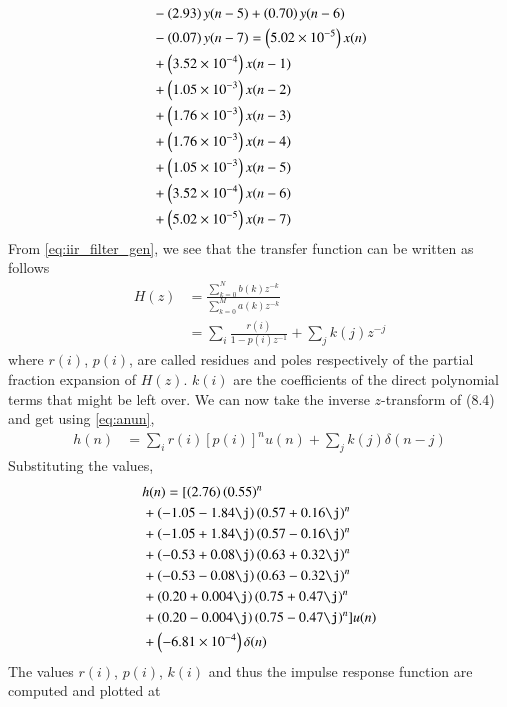 \documentclass[journal,12pt,twocolumn]{IEEEtran}
\renewcommand\thesection{\arabic{section}}
\begin{document}
\begin{enumerate}[label=\thesection.\arabic*
	,ref=\thesection.\theenumi]
\begin{enumerate}[label=\thesection.\arabic*]
\begin{align*}
&- \left(2.93\right)y(n - 5) \nonumber + \left(0.70\right)y(n - 6) \nonumber \\
&- \left(0.07\right)y(n - 7) = \left(5.02 \times 10^{-5}\right)x(n) \nonumber \\
&+ \left(3.52 \times 10^{-4}\right)x(n - 1)  \\
&+ \left(1.05 \times 10^{-3}\right)x(n - 2) \nonumber \\
&+ \left(1.76 \times 10^{-3}\right)x(n - 3) \\
&+ \left(1.76 \times 10^{-3}\right)x(n - 4) \nonumber \\
&+ \left(1.05 \times 10^{-3}\right)x(n - 5) \\
&+ \left(3.52 \times 10^{-4}\right)x(n - 6) \nonumber \\
&+ \left(5.02 \times 10^{-5}\right)x(n - 7)
\end{align*}
	From \eqref{eq:iir_filter_gen}, we see that the transfer function can be written as follows
	\begin{align}
		H(z) &= \frac{\sum_{k = 0}^{N}b(k)z^{-k}}{\sum_{k = 0}^{M}a(k)z^{-k}} \\
		&= \sum_{i}\frac{r(i)}{1 - p(i)z^{-1}} + \sum_{j}k(j)z^{-j}
		\label{eq:trans-func}
	\end{align}
	where $r(i)$, $p(i)$, are called residues and poles respectively of the partial 
	fraction expansion of $H(z)$. $k(i)$ are the coefficients of the direct polynomial 
	terms that might be left over. We can now take the inverse $z$-transform of (8.4) and get using \eqref{eq:anun},
	\begin{align}
		h(n) &= \sum_{i}r(i)[p(i)]^nu(n) + \sum_{j}k(j)\delta(n - j)
		\label{eq:h-n-expr}
	\end{align}
	Substituting the values,
	\begin{align}
		&h(n) = [\brak{2.76}\brak{0.55}^n \nonumber \\ 
		&+ \brak{-1.05-1.84\j}\brak{0.57+0.16\j}^n \nonumber \\
		&+ \brak{-1.05+1.84\j}\brak{0.57-0.16\j}^n \nonumber \\
		&+ \brak{-0.53+0.08\j}\brak{0.63+0.32\j}^n \nonumber \\
		&+ \brak{-0.53-0.08\j}\brak{0.63-0.32\j}^n \nonumber \\
		&+ \brak{0.20+0.004\j}\brak{0.75+0.47\j}^n \nonumber \\
		&+ \brak{0.20-0.004\j}\brak{0.75-0.47\j}^n]u(n) \nonumber \\
		&+ \brak{-6.81 \times 10^{-4}}\delta(n)
	\end{align}
	The values $r(i)$, $p(i)$, $k(i)$ and thus the impulse response function are computed and plotted at

\end{enumerate}
\end{enumerate}
\end{document}
